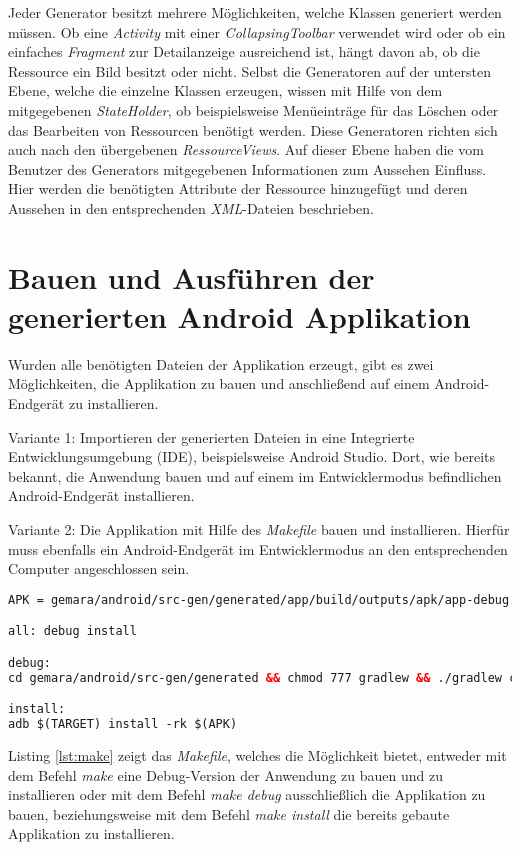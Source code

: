 Jeder Generator besitzt mehrere Möglichkeiten, welche Klassen generiert werden müssen. Ob eine \textit{Activity} mit einer \textit{CollapsingToolbar} verwendet wird oder ob ein einfaches \textit{Fragment} zur Detailanzeige ausreichend ist, hängt davon ab, ob die Ressource ein Bild besitzt oder nicht.
Selbst die Generatoren auf der untersten Ebene, welche die einzelne Klassen erzeugen, wissen mit Hilfe von dem mitgegebenen \textit{StateHolder}, ob beispielsweise Menüeinträge für das Löschen oder das Bearbeiten von Ressourcen benötigt werden. Diese Generatoren richten sich auch nach den übergebenen \textit{RessourceViews}. Auf dieser Ebene haben die vom Benutzer des Generators mitgegebenen Informationen zum Aussehen Einfluss. Hier werden die benötigten Attribute der Ressource hinzugefügt und deren Aussehen in den entsprechenden \textit{XML}-Dateien beschrieben.


\section{Bauen und Ausführen der generierten Android Applikation}

Wurden alle benötigten Dateien der Applikation erzeugt, gibt es zwei Möglichkeiten, die Applikation zu bauen und anschließend auf einem Android-Endgerät zu installieren.

Variante 1: Importieren der generierten Dateien in eine Integrierte Entwicklungsumgebung (IDE), beispielsweise Android Studio. Dort, wie bereits bekannt, die Anwendung bauen und auf einem im Entwicklermodus befindlichen Android-Endgerät installieren.

Variante 2: Die Applikation mit Hilfe des \textit{Makefile} bauen und installieren. Hierfür muss ebenfalls ein Android-Endgerät im Entwicklermodus an den entsprechenden Computer angeschlossen sein.

\newpage

\begin{lstlisting}[label=lst:make,
language=xml,
firstnumber=1,
caption=\textit{Makefile} für das Bauen und Installieren der erzeugten Applikation.]				   
APK = gemara/android/src-gen/generated/app/build/outputs/apk/app-debug.apk

all: debug install

debug:
cd gemara/android/src-gen/generated && chmod 777 gradlew && ./gradlew clean assembleDebug

install:
adb $(TARGET) install -rk $(APK)
\end{lstlisting}

Listing \ref{lst:make} zeigt das \textit{Makefile}, welches die Möglichkeit bietet, entweder mit dem Befehl \textit{make} eine Debug-Version der Anwendung zu bauen und zu installieren oder mit dem Befehl \textit{make debug} ausschließlich die Applikation zu bauen, beziehungsweise mit dem Befehl \textit{make install} die bereits gebaute Applikation zu installieren.
